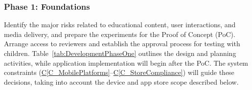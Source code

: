 \documentclass[10pt]{article}
\newcommand{\conref}[1]{\hyperref[#1]{C\ref*{#1}}}
\begin{document}
\subsubsection*{Phase 1: Foundations}

Identify the major risks related to educational content,
user interactions, and media delivery, and prepare the
experiments for the Proof of Concept (PoC). Arrange access
to reviewers and establish the approval process for testing
with children. Table~\ref{tab:DevelopmentPhaseOne} outlines the design
and planning activities, while application implementation
will begin after the PoC. The system constraints
(\conref{C_MobilePlatforms}--\conref{C_StoreCompliance})
will guide these decisions, taking into account the
device and app store scope described below.

\begingroup
\small
\renewcommand{\arraystretch}{1.15}
\end{document}
